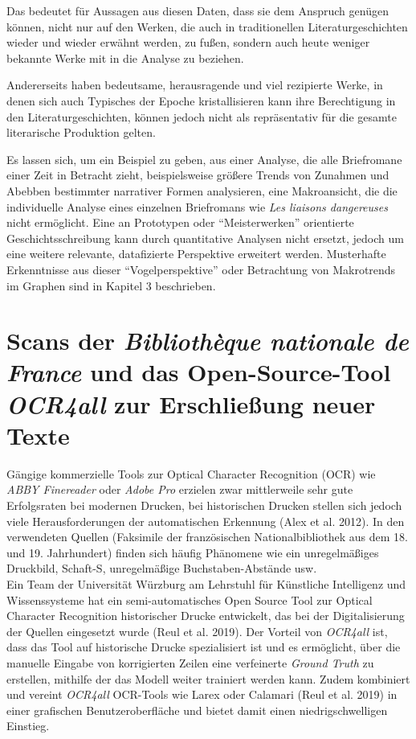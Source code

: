 \documentclass[
  12pt,
  letterpaper,
  DIV=11,
  numbers=noendperiod]{scrreprt}
\begin{document}
Das bedeutet für Aussagen aus diesen Daten, dass sie dem Anspruch
genügen können, nicht nur auf den Werken, die auch in traditionellen
Literaturgeschichten wieder und wieder erwähnt werden, zu fußen, sondern
auch heute weniger bekannte Werke mit in die Analyse zu beziehen.

Andererseits haben bedeutsame, herausragende und viel rezipierte Werke,
in denen sich auch Typisches der Epoche kristallisieren kann ihre
Berechtigung in den Literaturgeschichten, können jedoch nicht als
repräsentativ für die gesamte literarische Produktion gelten.

Es lassen sich, um ein Beispiel zu geben, aus einer Analyse, die alle
Briefromane einer Zeit in Betracht zieht, beispielsweise größere Trends
von Zunahmen und Abebben bestimmter narrativer Formen analysieren, eine
Makroansicht, die die individuelle Analyse eines einzelnen Briefromans
wie \emph{Les liaisons dangereuses} nicht ermöglicht. Eine an Prototypen
oder ``Meisterwerken'' orientierte Geschichtsschreibung kann durch
quantitative Analysen nicht ersetzt, jedoch um eine weitere relevante,
datafizierte Perspektive erweitert werden. Musterhafte Erkenntnisse aus
dieser ``Vogelperspektive'' oder Betrachtung von Makrotrends im Graphen
sind in Kapitel 3 beschrieben.

\section{\texorpdfstring{Scans der \emph{Bibliothèque nationale de
France} und das Open-Source-Tool \emph{OCR4all} zur Erschließung neuer
Texte}{Scans der Bibliothèque nationale de France und das Open-Source-Tool OCR4all zur Erschließung neuer Texte}}\label{scans-der-bibliothuxe8que-nationale-de-france-und-das-open-source-tool-ocr4all-zur-erschlieuxdfung-neuer-texte}

Gängige kommerzielle Tools zur Optical Character Recognition (OCR) wie
\emph{ABBY Finereader} oder \emph{Adobe Pro} erzielen zwar mittlerweile
sehr gute Erfolgsraten bei modernen Drucken, bei historischen Drucken
stellen sich jedoch viele Herausforderungen der automatischen Erkennung
(Alex et al. 2012). In den verwendeten Quellen (Faksimile der
französischen Nationalbibliothek aus dem 18. und 19. Jahrhundert) finden
sich häufig Phänomene wie ein unregelmäßiges Druckbild, Schaft-S,
unregelmäßige Buchstaben-Abstände usw.\\
Ein Team der Universität Würzburg am Lehrstuhl für Künstliche
Intelligenz und Wissenssysteme hat ein semi-automatisches Open Source
Tool zur Optical Character Recognition historischer Drucke entwickelt,
das bei der Digitalisierung der Quellen eingesetzt wurde (Reul et al.
2019). Der Vorteil von \emph{OCR4all} ist, dass das Tool auf historische
Drucke spezialisiert ist und es ermöglicht, über die manuelle Eingabe
von korrigierten Zeilen eine verfeinerte \emph{Ground Truth} zu
erstellen, mithilfe der das Modell weiter trainiert werden kann. Zudem
kombiniert und vereint \emph{OCR4all} OCR-Tools wie Larex oder Calamari
(Reul et al. 2019) in einer grafischen Benutzeroberfläche und bietet
damit einen niedrigschwelligen Einstieg.\\
\end{document}
